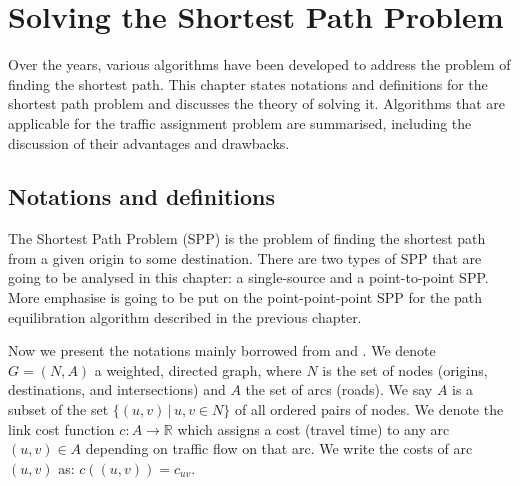 \chapter{Solving the Shortest Path Problem}
\label{chap:solvingspp}

Over the years,
various algorithms have been developed 
to address the problem of finding the shortest path.
This chapter states notations and definitions for the shortest path problem and discusses
the theory of solving it.
Algorithms that are applicable for the traffic assignment problem are summarised,
including the discussion of their advantages and drawbacks.

\section{Notations and definitions}
The Shortest Path Problem (SPP) is the problem of finding the shortest path from a given origin  to some destination.
There are two types of SPP that are going to
be analysed in this chapter:
a single-source and a point-to-point SPP.  
More emphasise is going to be put on the point-point-point SPP for the path equilibration algorithm described in the previous chapter.


Now we present the notations mainly borrowed from \citet{Cormen} and \citet{Klunder}.
We denote $ G = ( N, A ) $ a weighted, directed graph,
where $ N $ is the set of nodes (origins, destinations, and intersections)
and $ A $ the set of arcs (roads).
We say $ A $ is a subset of the set $ \{ (u, v)\, | \, u, v \in N \} $ of all ordered pairs of nodes.
We denote the link cost function $ c : A \rightarrow \mathbb{R} $ which assigns a cost (travel time) to any arc $ (u,v) \in A $ depending on traffic flow on that arc.
We write the costs of arc $(u, v)$ as: $ c((u, v)) = c_{uv} $.

